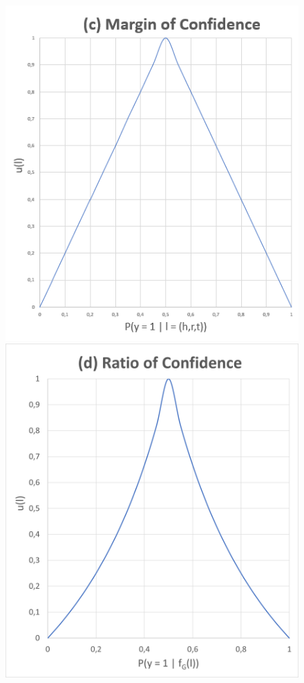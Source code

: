 \begin{figure}[H]
\begin{minipage}{.4\textwidth}
    \end{minipage}
    \begin{minipage}{.4\textwidth}
      \centering
      \includegraphics[width=\linewidth]{figures/smallest_margin_graph.PNG}
    \end{minipage}%
    \begin{minipage}{.4\textwidth}
      \centering
      \includegraphics[width=\linewidth]{figures/smallest_ratio.PNG}

\end{minipage}
\end{figure}
